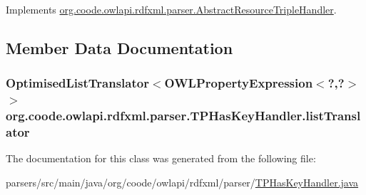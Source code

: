 Implements \hyperlink{classorg_1_1coode_1_1owlapi_1_1rdfxml_1_1parser_1_1_abstract_resource_triple_handler_acfa19ca318d5aaf7fc66e361ba02e7e8}{org.\-coode.\-owlapi.\-rdfxml.\-parser.\-Abstract\-Resource\-Triple\-Handler}.



\subsection{Member Data Documentation}
\hypertarget{classorg_1_1coode_1_1owlapi_1_1rdfxml_1_1parser_1_1_t_p_has_key_handler_ad40f09c05256ec963a390b6dd19dbb5b}{
\subsubsection[{list\-Translator}]{\setlength{\rightskip}{0pt plus 5cm}Optimised\-List\-Translator$<$O\-W\-L\-Property\-Expression$<$?,?$>$ $>$ org.\-coode.\-owlapi.\-rdfxml.\-parser.\-T\-P\-Has\-Key\-Handler.\-list\-Translator\hspace{0.3cm}{\ttfamily [private]}}}\label{classorg_1_1coode_1_1owlapi_1_1rdfxml_1_1parser_1_1_t_p_has_key_handler_ad40f09c05256ec963a390b6dd19dbb5b}


The documentation for this class was generated from the following file\-:\begin{DoxyCompactItemize}
\item 
parsers/src/main/java/org/coode/owlapi/rdfxml/parser/\hyperlink{_t_p_has_key_handler_8java}{T\-P\-Has\-Key\-Handler.\-java}\end{DoxyCompactItemize}
